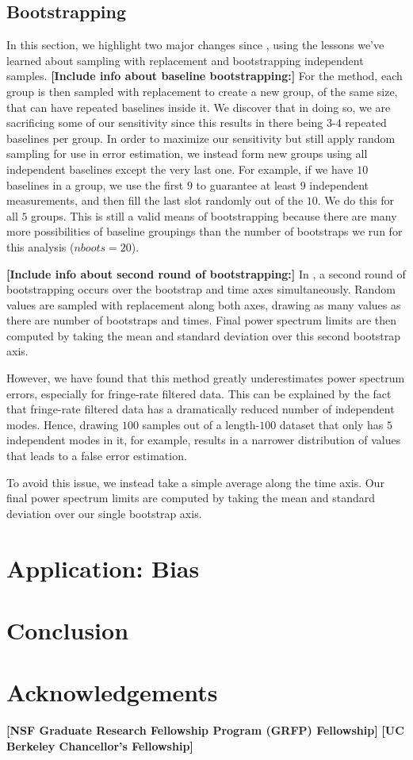 \documentclass[preprint2,numberedappendix,tighten,twocolappendix]{aastex6}  %
\newcommand{\cc}[1]{{\color{purple} \textbf{[#1]}}}
\begin{document}
\subsection{Bootstrapping}
\label{sec:Boot}

In this section, we highlight two major changes since \citet{ali_et_al2015}, using the lessons we've learned about sampling with replacement and bootstrapping independent samples.
\cc{Include info about baseline bootstrapping:}
For the \citet{ali_et_al2015} method, each group is then sampled with replacement to create a new group, of the same size, that can have repeated baselines inside it. We discover that in doing so, we are sacrificing some of our sensitivity since this results in there being 3-4 repeated baselines per group. In order to maximize our sensitivity but still apply random sampling for use in error estimation, we instead form new groups using all independent baselines except the very last one. For example, if we have $10$ baselines in a group, we use the first $9$ to guarantee at least $9$ independent measurements, and then fill the last slot randomly out of the $10$. We do this for all $5$ groups. This is still a valid means of bootstrapping because there are many more possibilities of baseline groupings than the number of bootstraps we run for this analysis ($nboots = 20$).

\cc{Include info about second round of bootstrapping:}
In \citet{ali_et_al2015}, a second round of bootstrapping occurs over the bootstrap and time axes simultaneously. Random values are sampled with replacement along both axes, drawing as many values as there are number of bootstraps and times. Final power spectrum limits are then computed by taking the mean and standard deviation over this second bootstrap axis. 

However, we have found that this method greatly underestimates power spectrum errors, especially for fringe-rate filtered data. This can be explained by the fact that fringe-rate filtered data has a dramatically reduced number of independent modes. Hence, drawing $100$ samples out of a length-$100$ dataset that only has $5$ independent modes in it, for example, results in a narrower distribution of values that leads to a false error estimation.

To avoid this issue, we instead take a simple average along the time axis. Our final power spectrum limits are computed by taking the mean and standard deviation over our single bootstrap axis. 


\section{Application: Bias}
\label{sec:Bias}


\section{Conclusion}
\label{sec:Con}

\section{Acknowledgements}
\cc{NSF Graduate Research Fellowship Program (GRFP) Fellowship}
\cc{UC Berkeley Chancellor's Fellowship}
\label{sec:Ack}



\end{document}
